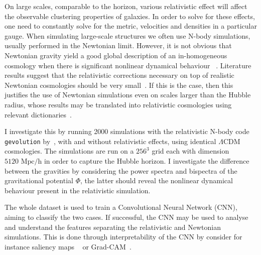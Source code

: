 
 On large scales, comparable to the horizon, various relativistic effect will affect the observable clustering properties of galaxies. In order to solve for these effects, one need to constantly solve for the metric, velocities and densities in a particular gauge. When simulating large-scale structures we often use N-body simulations, usually performed in the Newtonian limit. However, it is not obvious that Newtonian gravity yield a good global description of an in-homogeneous cosmology when there is significant nonlinear dynamical behaviour ~\parencite{jeong_large-scale_2012}. Literature results suggest that the relativistic corrections necessary on top of realistic Newtonian cosmologies should be very small~\parencite{chisari_connection_2011}. If this is the case, then this justifies the use of Newtonian simulations even on scales larger than the Hubble radius, whose results may be translated into relativistic cosmologies using relevant dictionaries~\parencite{green_newtonian_2012}.

I investigate this by running 2000 simulations with the relativistic N-body code \texttt{gevolution} by~\cite{adamek_gevolution_2016}, with and without relativistic effects, using identical $\Lambda$CDM cosmologies. The simulations are run on a $256^3$ grid each with dimension $5120\text{ Mpc/h}$ in order to capture the Hubble horizon. I investigate the difference between the gravities by considering the power spectra and bispectra of the gravitational potential $\Phi$, the latter should reveal the nonlinear dynamical behaviour present in the relativistic simulation. 

The whole dataset is used to train a Convolutional Neural Network (CNN), aiming to classify the two cases. If successful, the CNN may be used to analyse and understand the features separating the relativistic and Newtonian simulations. This is done through interpretability of the CNN by consider for instance saliency maps ~\parencite{alqaraawi_evaluating_2020} or Grad-CAM~\parencite{selvaraju_grad-cam_2020}. 